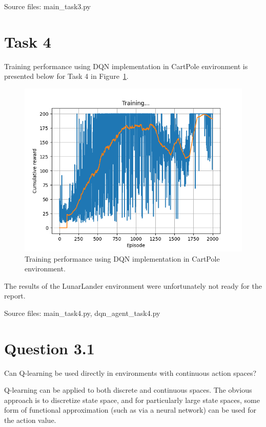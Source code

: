 \documentclass[12pt]{article}
\begin{document}
\noindent
Source files: main\_task3.py 



\section*{Task 4}

Training performance using DQN implementation in CartPole environment
is presented below for Task 4 in Figure~\ref*{fig:fig6}. 
\newline

\begin{figure}[h] 
	\centering  %
    \includegraphics[width=0.9\columnwidth]{img/Figure_6_task_4a_cumulative_reward.png}
	\caption{Training performance using DQN implementation in CartPole environment.}
	\label{fig:fig6}
\end{figure}


The results of the LunarLander environment were unfortunately not ready for the report.
\newline

\noindent
Source files: main\_task4.py, dqn\_agent\_task4.py 


\section*{Question 3.1}

Can Q-learning be used directly in environments with continuous action spaces?
\newline

Q-learning can be applied to both discrete and continuous spaces.
The obvious approach is to discretize state space, and for particularly large state spaces, some form of functional approximation (such as via a neural network) can be used for the action value.
\end{document}
